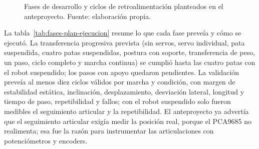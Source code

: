 \begin{figure}[H]
\centering
{}
\caption{Fases de desarrollo y ciclos de retroalimentación planteados en el
anteproyecto. Fuente: elaboración propia.}
\label{fig:metodologia_fases}
\end{figure}

La tabla~\ref{tab:fases-plan-ejecucion} resume lo que cada fase preveía y cómo
se ejecutó. La transferencia progresiva prevista (sin servos, servo individual,
pata suspendida, cuatro patas suspendidas, postura con soporte, transferencia de
peso, un paso, ciclo completo y marcha continua) se cumplió hasta las cuatro
patas con el robot suspendido; los pasos con apoyo quedaron pendientes. La
validación preveía al menos diez ciclos válidos por marcha y condición, con
margen de estabilidad estática, inclinación, desplazamiento, desviación lateral,
longitud y tiempo de paso, repetibilidad y fallos; con el robot suspendido solo
fueron medibles el seguimiento articular y la repetibilidad. El anteproyecto ya
advertía que el seguimiento articular exigía medir la posición real, porque el
PCA9685 no realimenta; esa fue la razón para instrumentar las articulaciones con
potenciómetros y encoders.

